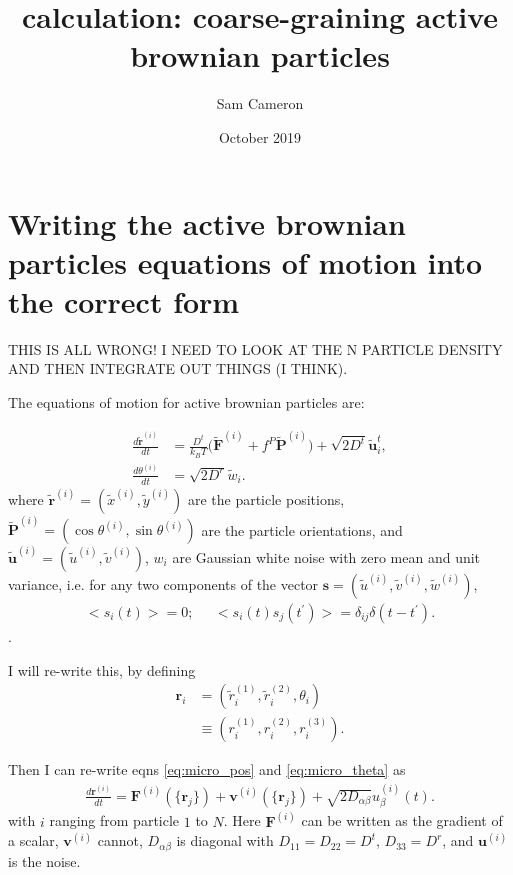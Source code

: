 \documentclass{article}
\title{calculation: coarse-graining active brownian particles}
\author{Sam Cameron}
\date{October 2019}
\begin{document}
\maketitle

\section{Writing the active brownian particles equations of motion into the correct form}

THIS IS ALL WRONG! I NEED TO LOOK AT THE N PARTICLE DENSITY AND THEN INTEGRATE OUT THINGS (I THINK).



The equations of motion for active brownian particles are:

\begin{align}
    \frac{d\tilde{\bm{r}}^{(i)}}{dt}&=\frac{D^t}{k_BT}\big(\tilde{\bm{F}}^{(i)}+f^P\tilde{\bm{P}}^{(i)}\big)+\sqrt{2D^t}\tilde{\bm{u}}_i^t,\label{eq:micro_pos}\\
    \frac{d\theta^{(i)}}{dt}&=\sqrt{2D^r}\tilde{w}_i.\label{eq:micro_theta}
\end{align}
where $\tilde{\bm{r}}^{(i)}=(\tilde{x}^{(i)},\tilde{y}^{(i)})$ are the particle positions, $\tilde{\bm{P}}^{(i)}=(\cos\theta^{(i)},\sin\theta^{(i)})$ are the particle orientations, and $\tilde{\bm{u}}^{(i)}=(\tilde{u}^{(i)},\tilde{v}^{(i)})$, $w_i$ are Gaussian white noise with zero mean and unit variance, i.e. for any two components of the vector $\bm{s}=(\tilde{u}^{(i)},\tilde{v}^{(i)},\tilde{w}^{(i)})$,
\begin{align}
    \big<s_i(t)\big>=0;\;\;\;\;\; \big<s_i(t)s_j(t^{\prime})\big>=\delta_{ij}\delta(t-t^{\prime}).
\end{align}.

I will re-write this, by defining
\begin{align}
    \bm{r}_i&=(\tilde{r}^{(1)}_i,\tilde{r}^{(2)}_i,\theta_i)\nonumber\\
    &\equiv(r^{(1)}_i,r^{(2)}_i,r^{(3)}_i).
\end{align}

Then I can re-write eqns \ref{eq:micro_pos} and \ref{eq:micro_theta} as
\begin{align}
    \frac{d\bm{r}^{(i)}}{dt}=\bm{F}^{(i)}(\{\bm{r}_j\})+\bm{v}^{(i)}(\{\bm{r}_j\})+\sqrt{2D_{\alpha\beta}}u_{\beta}^{(i)}(t).
\end{align}
with $i$ ranging from particle $1$ to $N$. Here $\bm{F}^{(i)}$ can be written as the gradient of a scalar, $\bm{v}^{(i)}$ cannot, $D_{\alpha\beta}$ is diagonal with $D_{11}=D_{22}=D^t$, $D_{33}=D^r$, and $\bm{u}^{(i)}$ is the noise.
\end{document}
